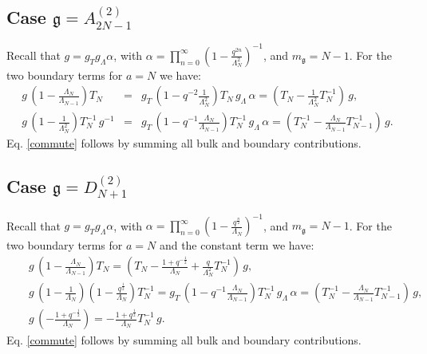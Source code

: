 \documentclass[12pt]{amsart}
\newcommand{\g}{{\mathfrak{g}}}
\newcommand{\al}{{\alpha}}
\newcommand{\lL}{{\Lambda}}
\numberwithin{equation}{section}
\begin{document}
\subsection{Case $\g=A_{2N-1}^{(2)}$}\label{A2osec} Recall that $g=g_Tg_\lL\al$, with $\al=\prod_{n=0}^\infty \left(1-\frac{q^{2n}}{\lL_N^2}\right)^{-1}$, and $m_\g=N-1$. For the two boundary terms for $a=N$ we have:
\begin{eqnarray*}
g\,\left(1-\frac{\Lambda_N}{\Lambda_{N-1}}\right)T_N&=&g_T\, \left(1-q^{-2}\frac{1}{\Lambda_N^2}\right) T_N\, g_\lL\,\al=\left(T_N-\frac{1}{\Lambda_N^2}T_{N}^{-1}\right)\,g,\\
g\,\left(1-\frac{1}{\Lambda_{N}^2}\right)T_N^{-1}\, g^{-1}&=&g_T\,\left(1-q^{-1}\frac{\Lambda_{N}}{\Lambda_{N-1}}\right)T_N^{-1} \,g_\lL\,\al=
\left(T_N^{-1}-\frac{\Lambda_{N}}{\Lambda_{N-1}}T_{N-1}^{-1}\right)\, g.
\end{eqnarray*}
Eq. \eqref{commute} follows by summing all bulk and boundary contributions.

\subsection{Case $\g=D_{N+1}^{(2)}$}\label{D2sec} Recall that $g=g_Tg_\lL\al$, with $\al=\prod_{n=0}^\infty \left(1-\frac{q^{\frac{n}{2}}}{\lL_N}\right)^{-1}$, and $m_\g=N-1$. For the two boundary terms for $a=N$ and the constant term we have:
\begin{eqnarray*}
&&g\,\left(1-\frac{\Lambda_N}{\Lambda_{N-1}}\right)T_N
%
%
%
=\left(T_N-\frac{1+q^{-\frac{1}{2}}}{\Lambda_N}+\frac{q}{\Lambda_N^{2}}T_N^{-1}\right)\, g,\\
&&g\,\left(1-\frac{1}{\Lambda_{N}}\right)\left(1-\frac{q^\frac{1}{2}}{\Lambda_{N}}\right)T_N^{-1}=
g_T\,\left(1-q^{-1}\frac{\Lambda_{N}}{\Lambda_{N-1}}\right)T_N^{-1} \, g_\lL\,\al=
\left(T_N^{-1}-\frac{\Lambda_{N}}{\Lambda_{N-1}}T_{N-1}^{-1}\right)\, g,\\
&&g\,\left(-\frac{1+q^{-\frac{1}{2}}}{\Lambda_{N}}\right)= -\frac{1+q^\frac{1}{2}}{\Lambda_{N}}T_N^{-1}\, g.
\end{eqnarray*}
Eq. \eqref{commute} follows by summing all bulk and boundary contributions.
\end{document}
